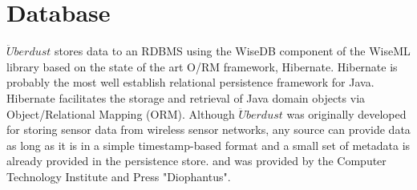 \documentclass[12pt,a4paper]{report}
\begin{document}
\section{Database}
$\ddot{U}berdust$ stores data to an RDBMS using the WiseDB component of the WiseML library based on the state of the art O/RM framework, Hibernate. Hibernate is probably the most well establish relational persistence framework for Java. Hibernate facilitates the storage and retrieval of Java domain objects via Object/Relational Mapping (ORM). Although $\ddot{U}berdust$ was originally developed for storing sensor data from wireless sensor networks, any source can provide data as long as it is in a simple timestamp-based format and a small set of metadata is already provided in the persistence store. and was provided by the Computer Technology Institute and Press "Diophantus". \cite{website:database} \\
%
\newpage
%
\end{document}
